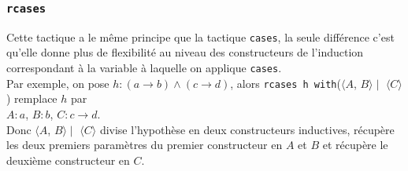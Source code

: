     \subsubsection{ \texttt{rcases}}
     Cette tactique a le même principe que la tactique \texttt{cases}, la seule différence c'est qu'elle donne plus de flexibilité au niveau des constructeurs de l'induction correspondant à la variable à laquelle on applique \texttt{cases}. \\ Par exemple, on pose $h:(a\rightarrow b)\wedge(c\rightarrow d)$, alors \texttt{rcases h with}($\langle A$, $B \rangle \mid $ $\langle C \rangle$) remplace $h$ par \\ $A:a$, $B:b$, $C:c\rightarrow d$.\\ Donc $\langle A$, $B \rangle \mid$ $\langle C\rangle$ divise l'hypothèse en deux constructeurs inductives, récupère les deux premiers paramètres du premier constructeur en $A$ et $B$ et récupère le deuxième constructeur en $C$. 
